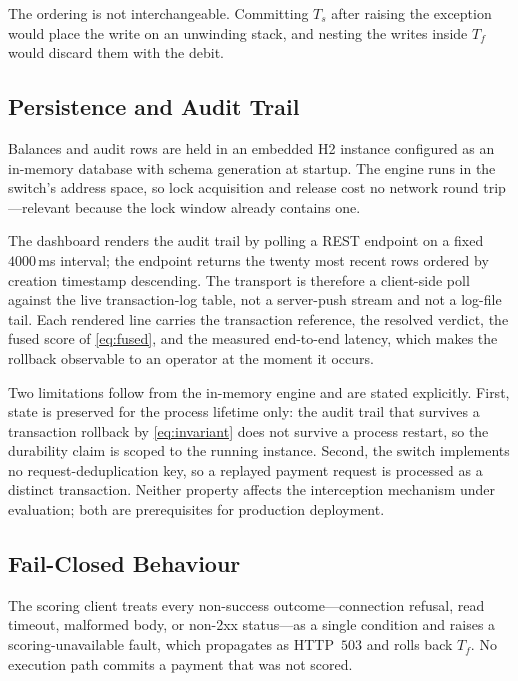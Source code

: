 \documentclass[conference]{IEEEtran}
\begin{document}
The ordering is not interchangeable. Committing $T_{s}$ after raising
the exception would place the write on an unwinding stack, and nesting
the writes inside $T_{f}$ would discard them with the debit.

\subsection{Persistence and Audit Trail}
\label{subsec:audit}

Balances and audit rows are held in an embedded H2 instance configured
as an in-memory database with schema generation at startup. The engine
runs in the switch's address space, so lock acquisition and release
cost no network round trip---relevant because the lock window already
contains one.

The dashboard renders the audit trail by polling a REST endpoint on a
fixed $4000$\,ms interval; the endpoint returns the twenty most recent
rows ordered by creation timestamp descending. The transport is
therefore a client-side poll against the live transaction-log table,
not a server-push stream and not a log-file tail. Each rendered line
carries the transaction reference, the resolved verdict, the fused
score of \eqref{eq:fused}, and the measured end-to-end latency, which
makes the rollback observable to an operator at the moment it occurs.

Two limitations follow from the in-memory engine and are stated
explicitly. First, state is preserved for the process lifetime only:
the audit trail that survives a transaction rollback by
\eqref{eq:invariant} does not survive a process restart, so the
durability claim is scoped to the running instance. Second, the switch
implements no request-deduplication key, so a replayed payment request
is processed as a distinct transaction. Neither property affects the
interception mechanism under evaluation; both are prerequisites for
production deployment.

\subsection{Fail-Closed Behaviour}
\label{subsec:failclosed}

The scoring client treats every non-success outcome---connection
refusal, read timeout, malformed body, or non-2xx status---as a single
condition and raises a scoring-unavailable fault, which propagates as
HTTP~$503$ and rolls back $T_{f}$. No execution path commits a payment
that was not scored.
\end{document}
